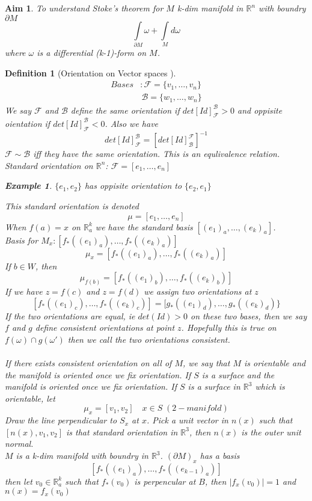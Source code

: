 \documentclass[11pt]{article}
\def\RR{\mathbb{R}}
\newtheorem{definition}{Definition}[section]
\newtheorem{example}{Example}[section]
\newtheorem*{aim}{Aim}
\begin{document}
\begin{aim}
To understand Stoke's theorem for $M$ k-dim manifold in $\RR^n$ with boundry $\partial M$
\[\int\limits_{\partial M} \omega + \int\limits_{M} d\omega\]
where $\omega$ is a differential (k-1)-form on $M$.
\end{aim}

\begin{definition}[Orientation on Vector spaces ]
\begin{align*}
Bases &: \mathcal{F}  =\{v_1, \dots  , v_n\}\\
 &\, \mathcal{B} = \{w_1, \dots, w_n\}
\end{align*}
We say $\mathcal{F}$ and $\mathcal{B}$ define the same orientation if $det [Id]_{\mathcal{F}}^{\mathcal{B}} >0$ and oppisite oientation if $det [Id]_{\mathcal{F}}^{\mathcal{B}} <0$. Also we have \[det [Id]_{\mathcal{F}}^{\mathcal{B}} = \left[det [Id]_{\mathcal{B}}^{\mathcal{F}}\right]^{-1}\]
$\mathcal{F} \sim \mathcal{B}$ iff they have the same orientation. This is an equlivalence relation.\\
Standard orientation on $\RR^n$: $\mathcal{F} = [e_1, \dots , e_n]$

\begin{example} $\{e_1, e_2\}$ has oppisite orientation to $\{e_2, e_1\}$ \end{example}

This standard orientation is denoted \[\mu = [e_1, \dots, e_n]\]
When $f(a)=x$ on $\RR_a^k$ we have the standard basis $[(e_1)_a, \dots , (e_k)_a]$. \\Basis for $M_x:[f_*((e_1)_a), \dots , f_*((e_k)_a)]$
\[\mu_x = [f_*((e_1)_a), \dots , f_*((e_k)_a)]\]
If $b \in W$, then 
\[\mu_{f(b)} = [f_*((e_1)_b), \dots , f_*((e_k)_b)]\]
If we have $z=f(c)$ and $z= f(d)$ we assign two orientations at $z$
\[ [f_*((e_1)_c), \dots , f_*((e_k)_c)]  = [g_*((e_1)_d), \dots , g_*((e_k)_d)\}\]
If the two orientations are equal, ie $det (Id) >0$ on these two bases, then we say $f$ and $g$ define consistent orientations at point $z$. Hopefully this is true on $f(\omega)\cap g(\omega')$ then we call the two orientations consistent. \\\quad \\ If there exists consistent orientation on all of $M$, we say that $M$ is orientable and the manifold is oriented once we fix orientation. If $S$ is a surface and the manifold is oriented once we fix orientation. If $S$ is a surface in $\RR^3$ which is orientable, let 
\[\mu_x = [v_1, v_2] \quad x \in S \;(2-manifold)\]
Draw the line perpendicular to $S_x$ at $x$.  Pick a unit vector in $n(x)$ such that $[n(x), v_1, v_2]$ is that standard orientation in $\RR^3$, then $n(x)$ is the outer unit normal.\\
$M$ is  a k-dim manifold with boundry in $\RR^3$. $(\partial M)_x$ has a basis
\[[f_*((e_1)_a), \dots , f_*((e_{k-1})_a) ] \] then let $v_0 \in \RR_a^k$ such that $f_*(v_0)$ is perpencular at $B$, then $|f_x(v_0)| =1$ and $n(x) = f_x(v_0)$
\end{definition}
\end{document}
